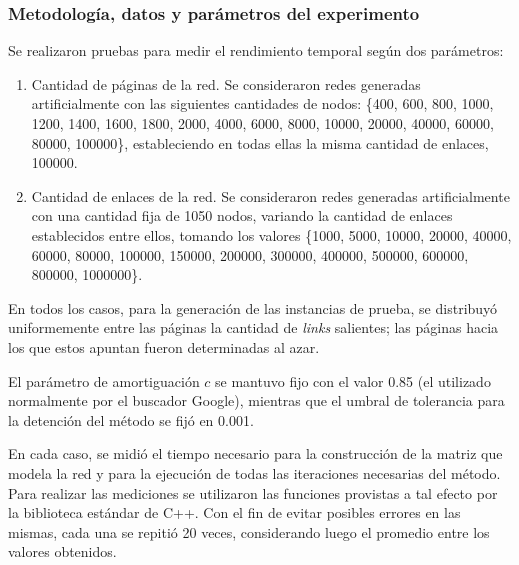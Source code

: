             \subsubsection*{Metodología, datos y parámetros del experimento}
                Se realizaron pruebas para medir el rendimiento temporal según dos parámetros:
                \begin{enumerate}[label=(\alph*)]
                    \item Cantidad de páginas de la red. Se consideraron redes generadas artificialmente con las siguientes cantidades de nodos: \{400, 600, 800, 1000, 1200, 1400, 1600, 1800, 2000, 4000, 6000, 8000, 10000, 20000, 40000, 60000, 80000, 100000\}, estableciendo en todas ellas la misma cantidad de enlaces, 100000.

                    \item Cantidad de enlaces de la red. Se consideraron redes generadas artificialmente con una cantidad fija de 1050 nodos, variando la cantidad de enlaces establecidos entre ellos, tomando los valores \{1000, 5000, 10000, 20000, 40000, 60000, 80000, 100000, 150000, 200000, 300000, 400000, 500000, 600000, 800000, 1000000\}.
                \end{enumerate}

                En todos los casos, para la generación de las instancias de prueba, se distribuyó uniformemente entre las páginas la cantidad de \emph{links} salientes; las páginas hacia los que estos apuntan fueron determinadas al azar.

                El parámetro de amortiguación $c$ se mantuvo fijo con el valor 0.85 (el utilizado normalmente por el buscador Google\cite{Brin1998}), mientras que el umbral de tolerancia para la detención del método se fijó en 0.001.

                En cada caso, se midió el tiempo necesario para la construcción de la matriz que modela la red y para la ejecución de todas las iteraciones necesarias del método. Para realizar las mediciones se utilizaron las funciones provistas a tal efecto por la biblioteca estándar de C++. Con el fin de evitar posibles errores en las mismas, cada una se repitió 20 veces, considerando luego el promedio entre los valores obtenidos.

